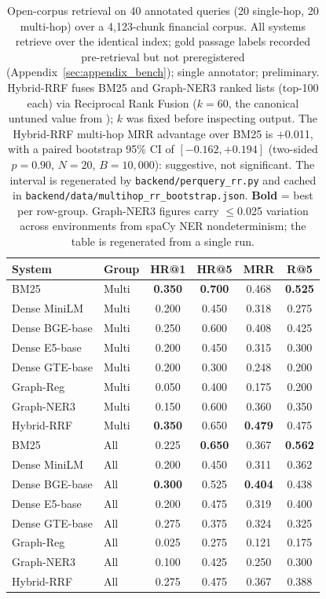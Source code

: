 \documentclass[runningheads]{llncs}
\begin{document}
\begin{table}[t]
\centering
\small
\setlength{\tabcolsep}{2pt}
\renewcommand{\arraystretch}{0.95}
\begin{tabular}{@{}llcccc@{}}
\toprule
\textbf{System} & \textbf{Group} & \textbf{HR@1} & \textbf{HR@5} & \textbf{MRR} & \textbf{R@5} \\
\midrule
BM25            & Multi & \textbf{0.350} & \textbf{0.700} & 0.468 & \textbf{0.525} \\
Dense MiniLM    & Multi & 0.200 & 0.450 & 0.318 & 0.275 \\
Dense BGE-base  & Multi & 0.250 & 0.600 & 0.408 & 0.425 \\
Dense E5-base   & Multi & 0.200 & 0.450 & 0.315 & 0.300 \\
Dense GTE-base  & Multi & 0.200 & 0.300 & 0.248 & 0.200 \\
Graph-Reg      & Multi & 0.050 & 0.400 & 0.175 & 0.200 \\
Graph-NER3     & Multi & 0.150 & 0.600 & 0.360 & 0.350 \\
Hybrid-RRF & Multi & \textbf{0.350} & 0.650 & \textbf{0.479} & 0.475 \\
\midrule
BM25            & All & 0.225 & \textbf{0.650} & 0.367 & \textbf{0.562} \\
Dense MiniLM    & All & 0.200 & 0.450 & 0.311 & 0.362 \\
Dense BGE-base  & All & \textbf{0.300} & 0.525 & \textbf{0.404} & 0.438 \\
Dense E5-base   & All & 0.200 & 0.475 & 0.319 & 0.400 \\
Dense GTE-base  & All & 0.275 & 0.375 & 0.324 & 0.325 \\
Graph-Reg      & All & 0.025 & 0.275 & 0.121 & 0.175 \\
Graph-NER3     & All & 0.100 & 0.425 & 0.250 & 0.300 \\
Hybrid-RRF & All & 0.275 & 0.475 & 0.367 & 0.388 \\
\bottomrule
\end{tabular}
\caption{Open-corpus retrieval on 40 annotated queries (20 single-hop, 20 multi-hop) over a 4{,}123-chunk financial corpus. All systems retrieve over the identical index; gold passage labels recorded pre-retrieval but not preregistered (Appendix~\ref{sec:appendix_bench}); single annotator; preliminary. Hybrid-RRF fuses BM25 and Graph-NER3 ranked lists (top-100 each) via Reciprocal Rank Fusion ($k{=}60$, the canonical untuned value from \cite{cormack2009reciprocal}); $k$ was fixed before inspecting output. The Hybrid-RRF multi-hop MRR advantage over BM25 is $+$0.011, with a paired bootstrap 95\% CI of $[-0.162, +0.194]$ (two-sided $p=0.90$, $N{=}20$, $B{=}10{,}000$): suggestive, not significant. The interval is regenerated by \texttt{backend/perquery\_rr.py} and cached in \texttt{backend/data/multihop\_rr\_bootstrap.json}. \textbf{Bold} = best per row-group. Graph-NER3 figures carry $\le$0.025 variation across environments from spaCy NER nondeterminism; the table is regenerated from a single run.}
\label{tab:financial_eval}
\end{table}
\end{document}
